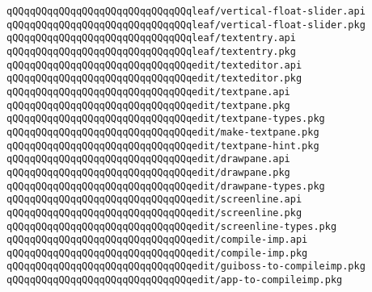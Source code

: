 \newline
\verb|qQQqqQQqqQQqqQQqqQQqqQQqqQQqqQQqleaf/vertical-float-slider.api|\newline
\verb|qQQqqQQqqQQqqQQqqQQqqQQqqQQqqQQqleaf/vertical-float-slider.pkg|\newline
\newline
\verb|qQQqqQQqqQQqqQQqqQQqqQQqqQQqqQQqleaf/textentry.api|\newline
\verb|qQQqqQQqqQQqqQQqqQQqqQQqqQQqqQQqleaf/textentry.pkg|\newline
\newline
\verb|qQQqqQQqqQQqqQQqqQQqqQQqqQQqqQQqedit/texteditor.api|\newline
\verb|qQQqqQQqqQQqqQQqqQQqqQQqqQQqqQQqedit/texteditor.pkg|\newline
\newline
\verb|qQQqqQQqqQQqqQQqqQQqqQQqqQQqqQQqedit/textpane.api|\newline
\verb|qQQqqQQqqQQqqQQqqQQqqQQqqQQqqQQqedit/textpane.pkg|\newline
\verb|qQQqqQQqqQQqqQQqqQQqqQQqqQQqqQQqedit/textpane-types.pkg|\newline
\verb|qQQqqQQqqQQqqQQqqQQqqQQqqQQqqQQqedit/make-textpane.pkg|\newline
\verb|qQQqqQQqqQQqqQQqqQQqqQQqqQQqqQQqedit/textpane-hint.pkg|\newline
\newline
\verb|qQQqqQQqqQQqqQQqqQQqqQQqqQQqqQQqedit/drawpane.api|\newline
\verb|qQQqqQQqqQQqqQQqqQQqqQQqqQQqqQQqedit/drawpane.pkg|\newline
\verb|qQQqqQQqqQQqqQQqqQQqqQQqqQQqqQQqedit/drawpane-types.pkg|\newline
\newline
\verb|qQQqqQQqqQQqqQQqqQQqqQQqqQQqqQQqedit/screenline.api|\newline
\verb|qQQqqQQqqQQqqQQqqQQqqQQqqQQqqQQqedit/screenline.pkg|\newline
\verb|qQQqqQQqqQQqqQQqqQQqqQQqqQQqqQQqedit/screenline-types.pkg|\newline
\newline
\verb|qQQqqQQqqQQqqQQqqQQqqQQqqQQqqQQqedit/compile-imp.api|\newline
\verb|qQQqqQQqqQQqqQQqqQQqqQQqqQQqqQQqedit/compile-imp.pkg|\newline
\verb|qQQqqQQqqQQqqQQqqQQqqQQqqQQqqQQqedit/guiboss-to-compileimp.pkg|\newline
\verb|qQQqqQQqqQQqqQQqqQQqqQQqqQQqqQQqedit/app-to-compileimp.pkg|\newline
